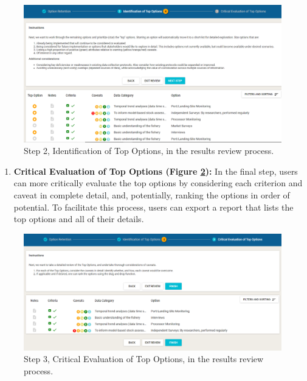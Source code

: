 \documentclass[11pt,]{book}
\providecommand{\tightlist}{%
  \setlength{\itemsep}{0pt}\setlength{\parskip}{0pt}}
\begin{document}
\begin{figure}

{\centering \includegraphics[width=0.95\linewidth]{images/review-step-2} 

}

\caption{Step 2, Identification of Top Options, in the results review process.}\label{fig:review-step-2}
\end{figure}

\begin{enumerate}
\def\labelenumi{\arabic{enumi}.}
\setcounter{enumi}{2}
\tightlist
\item
  \textbf{Critical Evaluation of Top Options (Figure \ref{fig:review-step-3}):} In the final step, users can more critically evaluate the top options by considering each criterion and caveat in complete detail, and, potentially, ranking the options in order of potential. To facilitate this process, users can export a report that lists the top options and all of their details.
\end{enumerate}

\begin{figure}

{\centering \includegraphics[width=0.95\linewidth]{images/review-step-3} 

}

\caption{Step 3, Critical Evaluation of Top Options, in the results review process.}\label{fig:review-step-3}
\end{figure}
\end{document}
